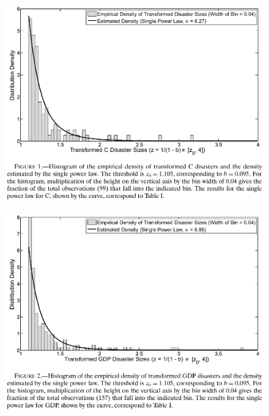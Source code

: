\documentclass{beamer}
\begin{document}
\begin{frame}
  \begin{figure}
    \includegraphics[scale=.7]{barro_jin1.eps}
  \end{figure}
\end{frame}

\begin{frame}
  \begin{figure}
    \includegraphics[scale=.7]{barro_jin2.eps}
  \end{figure}
\end{frame}
\end{document}
